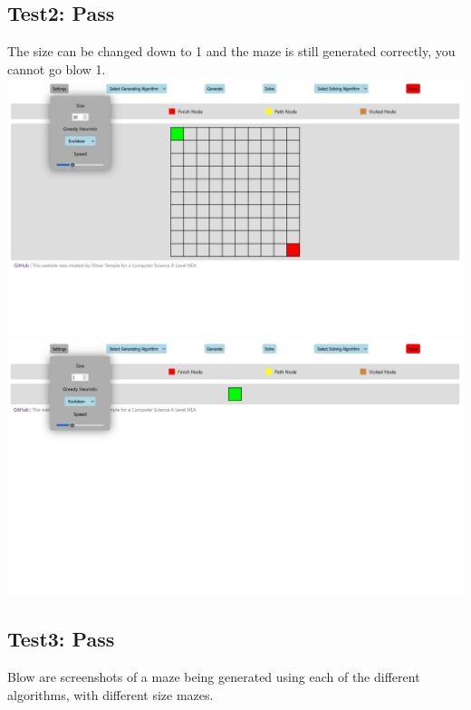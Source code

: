 \documentclass{article}
\begin{document}
\subsection{Test2: Pass}
The size can be changed down to 1 and the maze is still generated correctly, you cannot go blow 1.
\newline
\includegraphics[width=\linewidth]{assets/testing/test2a.jpg}
\includegraphics[width=\linewidth]{assets/testing/test2b.jpg}

\subsection{Test3: Pass}
Blow are screenshots of a maze being generated using each of the different algorithms, with different size mazes.
\end{document}
